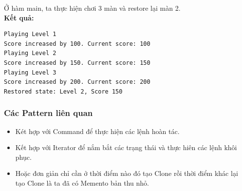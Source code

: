 Ở hàm main, ta thực hiện chơi 3 màn và restore lại màn 2.\\
\newline
\textbf{Kết quả:}
\begin{lstlisting}
Playing Level 1
Score increased by 100. Current score: 100
Playing Level 2
Score increased by 150. Current score: 150
Playing Level 3
Score increased by 200. Current score: 200
Restored state: Level 2, Score 150
\end{lstlisting}
\subsubsection{Các Pattern liên quan}
\begin{itemize}
    \item Két hợp với Command để thực hiện các lệnh hoàn tác.
    \item Kết hợp với Iterator để nắm bắt các trạng thái và thực hiên các lệnh khôi phục.
    \item Hoặc đơn giản chỉ cần ở thời điểm nào đó tạo Clone rồi thời điểm khác lại tạo Clone là ta đã có Memento bản thu nhỏ.
\end{itemize}